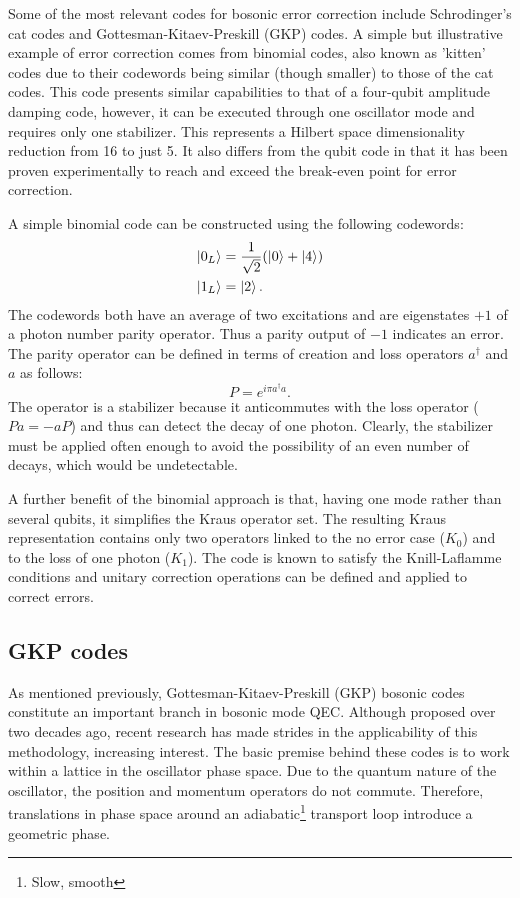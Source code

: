 Some of the most relevant codes for bosonic error correction include Schrodinger's cat codes and Gottesman-Kitaev-Preskill (GKP) codes. A simple but illustrative example of error correction comes from binomial codes, also known as 'kitten' codes due to their codewords being similar (though smaller) to those of the cat codes. This code presents similar capabilities to that of a four-qubit amplitude damping code, however, it can be executed through one oscillator mode and requires only one stabilizer. This represents a Hilbert space dimensionality reduction from 16 to just 5. It also differs from the qubit code in that it has been proven experimentally to reach and exceed the break-even point for error correction.

A simple binomial code can be constructed using the following codewords:
\begin{eqnarray}
    \ket{0_L}&=\frac{1}{\sqrt{2}}(\ket{0}+\ket{4})\\
    \ket{1_L}&=\ket{2}.
\end{eqnarray}
The codewords both have an average of two excitations and are eigenstates $+ 1$ of a photon number parity operator. Thus a parity output of $-1$ indicates an error. The parity operator can be defined in terms of creation and loss operators $a^\dagger$ and $a$ as follows:
\begin{equation}
    P=e^{i\pi a^\dagger a}.
\end{equation}
The operator is a stabilizer because it anticommutes with the loss operator ($Pa=-aP$) and thus can detect the decay of one photon. Clearly, the stabilizer must be applied often enough to avoid the possibility of an even number of decays, which would be undetectable. 

A further benefit of the binomial approach is that, having one mode rather than several qubits, it simplifies the Kraus operator set. The resulting Kraus representation contains only two operators linked to the no error case ($K_0$) and to the loss of one photon ($K_1$). The code is known to satisfy the Knill-Laflamme conditions and unitary correction operations can be defined and applied to correct errors.

\subsection{GKP codes}

As mentioned previously, Gottesman-Kitaev-Preskill (GKP) bosonic codes constitute an important branch in bosonic mode QEC. Although proposed over two decades ago, recent research has made strides in the applicability of this methodology, increasing interest. The basic premise behind these codes is to work within a lattice in the oscillator phase space. Due to the quantum nature of the oscillator, the position and momentum operators do not commute. Therefore, translations in phase space around an adiabatic\footnote{Slow, smooth} transport loop introduce a geometric phase.

